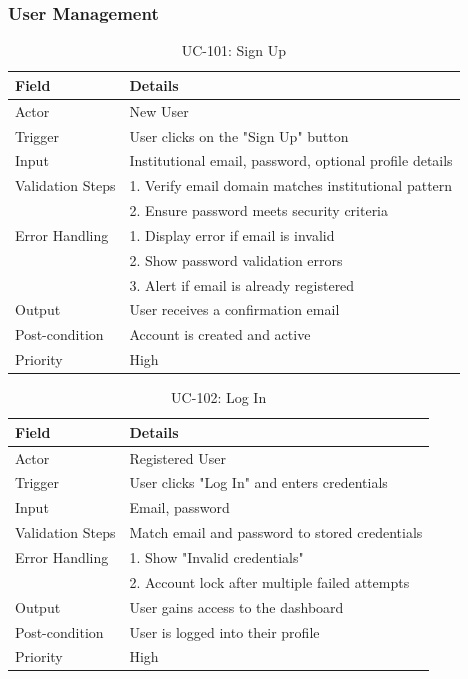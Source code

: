 \subsubsection{User Management}
\begin{table}[H]
\centering
\caption{UC-101: Sign Up}
\begin{tabular}{|l|p{10cm}|}
\hline
\textbf{Field} & \textbf{Details} \\ \hline
Actor & New User \\ \hline
Trigger & User clicks on the "Sign Up" button \\ \hline
Input & Institutional email, password, optional profile details \\ \hline
Validation Steps & 1. Verify email domain matches institutional pattern \\ 
                 & 2. Ensure password meets security criteria \\ \hline
Error Handling & 1. Display error if email is invalid \\ 
               & 2. Show password validation errors \\ 
               & 3. Alert if email is already registered \\ \hline
Output & User receives a confirmation email \\ \hline
Post-condition & Account is created and active \\ \hline
Priority & High \\ \hline
\end{tabular}
\end{table}

\begin{table}[H]
\centering
\caption{UC-102: Log In}
\begin{tabular}{|l|p{10cm}|}
\hline
\textbf{Field} & \textbf{Details} \\ \hline
Actor & Registered User \\ \hline
Trigger & User clicks "Log In" and enters credentials \\ \hline
Input & Email, password \\ \hline
Validation Steps & Match email and password to stored credentials \\ \hline
Error Handling & 1. Show "Invalid credentials" \\ 
               & 2. Account lock after multiple failed attempts \\ \hline
Output & User gains access to the dashboard \\ \hline
Post-condition & User is logged into their profile \\ \hline
Priority & High \\ \hline
\end{tabular}
\end{table}

